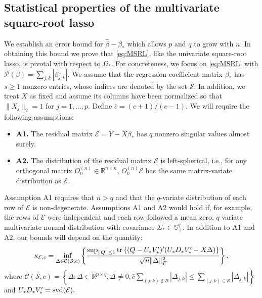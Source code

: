 \documentclass[12pt]{article}
\begin{document}
\subsection{Statistical properties of the multivariate square-root lasso}
We establish an error bound for $\hat{\beta} - \beta_*$ which allows $p$ and $q$ to grow with $n$. In obtaining this bound we prove that \eqref{eq:MSRL}, like the univariate square-root lasso, is pivotal with respect to $\Omega_*$. For concreteness, we focus on \eqref{eq:MSRL} with $\mathcal{P}(\beta) = \sum_{j,k}|\beta_{j,k}|$. We assume that the regression coefficient matrix $\beta_*$ has $s \geq 1$ nonzero entries, whose indices are denoted by the set $\mathcal{S}$. In addition, we treat $X$ as fixed and assume its columns have been normalized so that $\|X_j\|_2 = 1$ for $j = 1, \dots, p$. Define $\bar{c} = (c+1)/(c-1)$. We will require the following assumptions: 
\begin{itemize}
 \item[] \textbf{A1.} The residual matrix $\mathcal{E} = Y - X\beta_*$ has $q$ nonzero singular values almost surely. 
 \item[]\textbf{A2.} The distribution of the residual matrix $\mathcal{E}$ is left-spherical, i.e., for any orthogonal matrix $O_n^{(n)} \in \mathbb{R}^{n \times n}$, 
$O_n^{(n)} \mathcal{E}$ has the same matrix-variate distribution as $\mathcal{E}$. 
\end{itemize}
Assumption A1 requires that $n > q$ and that the $q$-variate distribution of each row of $\mathcal{E}$ is non-degenerate. Assumptions A1 and A2 would hold if, for example, the rows of $\mathcal{E}$ were independent and each row followed a mean zero, $q$-variate multivariate normal distribution with covariance $\Sigma_* \in \mathbb{S}^q_+.$ In addition to A1 and A2, our bounds will depend on the quantity:
$$\kappa_{\mathcal{E},c} = \inf_{\Delta \in \mathcal{C}(\mathcal{S}, c)} \left\{ \frac{\sup_{\|Q\| \leq 1} {\rm tr}\left\{ (Q - U_*V_*')'(U_*D_*V_*' - X \Delta) \right\} }{ \sqrt{n}\|\Delta\|_F^2}\right\},$$
where $\mathcal{C}(\mathcal{S}, c) = \left\{ \Delta: \Delta \in \mathbb{R}^{p \times q}, \Delta  \neq 0, \bar{c} \sum_{(j,k) \notin \mathcal{S}}|\Delta_{j,k}| \leq \sum_{(j,k) \in \mathcal{S}}|\Delta_{j,k}| \right\}$ and $U_*D_*V_*' = {\rm svd}(\mathcal{E}).$
\end{document}
